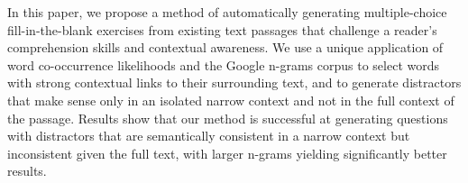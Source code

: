 In this paper, we propose a method of automatically generating multiple-choice fill-in-the-blank exercises from existing text passages that challenge a reader's comprehension skills and contextual awareness. We use a unique application of word co-occurrence likelihoods and the Google n-grams corpus to select words with strong contextual links to their surrounding text, and to generate distractors that make sense only in an isolated narrow context and not in the full context of the passage. Results show that our method is successful at generating questions with distractors that are semantically consistent in a narrow context but inconsistent given the full text, with larger n-grams yielding significantly better results.
